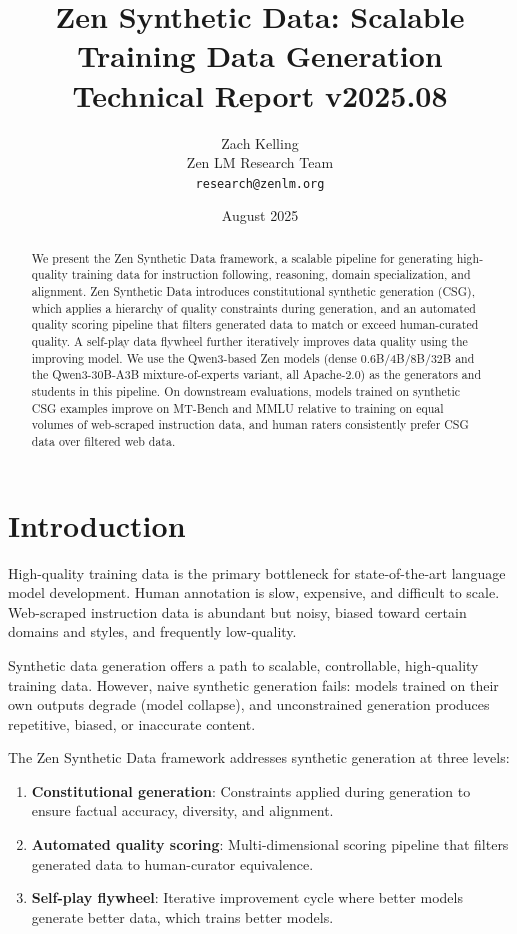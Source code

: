 \documentclass[11pt,a4paper]{article}
\title{\textbf{Zen Synthetic Data: Scalable Training Data Generation}\\
\large Technical Report v2025.08}
\author{Zach Kelling \\ Zen LM Research Team\\
\texttt{research@zenlm.org}}
\date{August 2025}
\begin{document}
\maketitle

\begin{abstract}
We present the Zen Synthetic Data framework, a scalable pipeline for generating high-quality training data for instruction following, reasoning, domain specialization, and alignment. Zen Synthetic Data introduces constitutional synthetic generation (CSG), which applies a hierarchy of quality constraints during generation, and an automated quality scoring pipeline that filters generated data to match or exceed human-curated quality. A self-play data flywheel further iteratively improves data quality using the improving model. We use the Qwen3-based Zen models (dense 0.6B/4B/8B/32B and the Qwen3-30B-A3B mixture-of-experts variant, all Apache-2.0) as the generators and students in this pipeline. On downstream evaluations, models trained on synthetic CSG examples improve on MT-Bench and MMLU relative to training on equal volumes of web-scraped instruction data, and human raters consistently prefer CSG data over filtered web data.
\end{abstract}

\section{Introduction}

High-quality training data is the primary bottleneck for state-of-the-art language model development. Human annotation is slow, expensive, and difficult to scale. Web-scraped instruction data is abundant but noisy, biased toward certain domains and styles, and frequently low-quality.

Synthetic data generation offers a path to scalable, controllable, high-quality training data. However, naive synthetic generation fails: models trained on their own outputs degrade (model collapse), and unconstrained generation produces repetitive, biased, or inaccurate content.

The Zen Synthetic Data framework addresses synthetic generation at three levels:

\begin{enumerate}
  \item \textbf{Constitutional generation}: Constraints applied during generation to ensure factual accuracy, diversity, and alignment.
  \item \textbf{Automated quality scoring}: Multi-dimensional scoring pipeline that filters generated data to human-curator equivalence.
  \item \textbf{Self-play flywheel}: Iterative improvement cycle where better models generate better data, which trains better models.
\end{enumerate}
\end{document}
